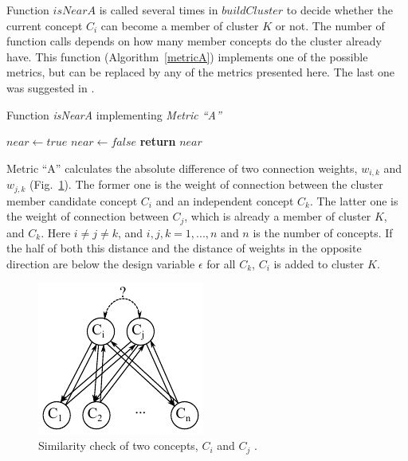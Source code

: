 \documentclass[graybox]{svmult}
\begin{document}
Function $isNearA$ is called several times in $buildCluster$ to decide whether the current concept $C_i$ can become a member of cluster $K$ or not. The number of function calls depends on how many member concepts do the cluster already have. This function (Algorithm~\ref{metricA}) implements one of the possible metrics, but can be replaced by any of the metrics presented here. The last one was suggested in \cite{hatwagnerm.f.koczyl.t.2015}.

\begin{algorithm}
  \caption{Function \emph{isNearA} implementing \emph{Metric ``A''}}\label{metricA}
  \begin{algorithmic}[1]
      \State $near \gets true$
            \State $near \gets false$
          \EndIf
        \EndIf
      \EndFor
      \State \textbf{return} $near$
    \EndFunction
  \end{algorithmic}
\end{algorithm}

Metric ``A'' calculates the absolute difference of two connection weights, $w_{i,k}$ and $w_{j,k}$ (Fig.~\ref{fig:similarity}). The former one is the weight of connection between the cluster member candidate concept $C_i$ and an independent concept $C_k$. The latter one is the weight of connection between $C_j$, which is already a member of cluster $K$, and $C_k$. Here $i \ne j \ne k$, and $i, j, k = 1, ..., n$ and $n$ is the number of concepts. If the half of both this distance and the distance of weights in the opposite direction are below the design variable $\epsilon$ for all $C_k$, $C_i$ is added to cluster $K$.

\begin{figure}[hbt]
  \sidecaption
  \includegraphics[scale=1]{similarity.pdf}
  \caption{Similarity check of two concepts, $C_i$ and $C_j$ \cite{hatwagner2018two}.}
  \label{fig:similarity}
\end{figure}
\end{document}
